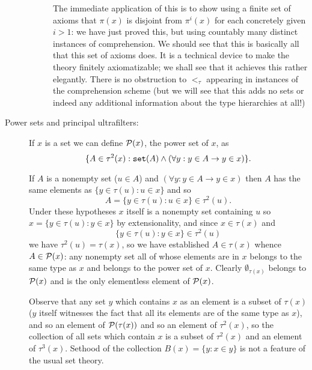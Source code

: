 \documentclass[12pt]{article}
\begin{document}
\begin{description}
\begin{description}
\begin{enumerate}
\end{enumerate}

The immediate application of this is to show using a finite set of axioms that $\pi(x)$ is disjoint from $\pi^i(x)$ for each concretely given $i>1$:  we have just proved this, but using countably many distinct instances of comprehension.  We should see that this is basically all that this set of axioms does.  It is a technical device to make the theory finitely axiomatizable;  we shall see that it achieves this rather elegantly. There is no obstruction to $<_\tau$ appearing in instances of the comprehension scheme (but we will see that this adds no sets or indeed any additional information about the type hierarchies at all!)


\end{description}

\item[Power sets and principal ultrafilters:]    If $x$ is a set we can define ${\cal P}(x)$, the power set of $x$, as $$\{A \in \tau^2(x):{\tt set}(A) \wedge (\forall y:y \in A \rightarrow y \in x)\}.$$  

If $A$ is a nonempty set ($u \in A$) and $(\forall y:y \in A \rightarrow y \in x)$ then $A$ has the same elements as
$\{y \in \tau(u):u \in x\}$ and so $$A = \{y \in \tau(u):u \in x\} \in \tau^2(u).$$ Under these hypotheses $x$ itself is a nonempty
set containing $u$ so $x = \{y \in \tau(u):y \in x\}$ by extensionality, and since $x \in \tau(x)$ and  $$\{y \in \tau(u):y \in x\}\in \tau^2(u)$$ we have $\tau^2(u)=\tau(x)$, so we have established $A \in \tau(x)$ whence $A \in {\cal P}(x)$:  any nonempty set all of whose elements are in $x$ belongs to the same type as $x$ and belongs to the power set of $x$.
Clearly $\emptyset_{\tau(x)}$ belongs to ${\cal P}(x)$ and is the only elementless element of ${\cal P}(x)$.

Observe that any set $y$ which contains $x$ as an element  is a subset of $\tau(x)$ ($y$ itself witnesses the fact that all its elements
are of the same type as $x$), and so an element of ${\cal P}(\tau(x))$ and so an element of $\tau^2(x)$, so the collection of all sets which contain $x$ is a subset of $\tau^2(x)$ and an element of $\tau^3(x)$.  Sethood of the collection $B(x) = \{y:x \in y\}$ is not a feature of the usual set theory.


\end{description}
\end{document}
